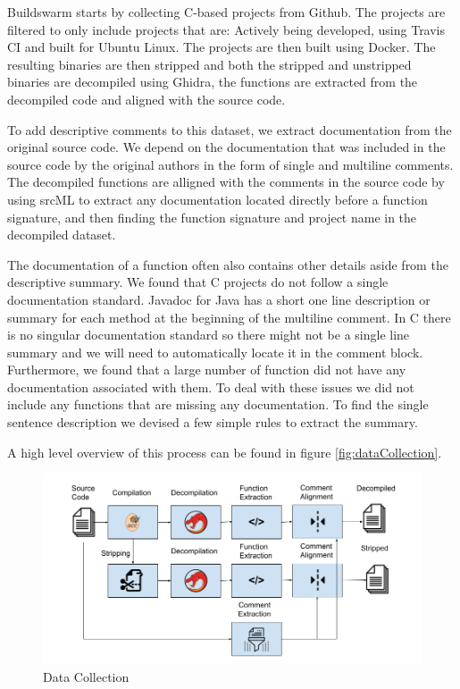 Buildswarm starts by collecting C-based projects from Github. The projects are filtered to only include projects that are: Actively being developed, using Travis CI and built for Ubuntu Linux. The projects are then built using Docker. The resulting binaries are then stripped and both the stripped and unstripped binaries are decompiled using Ghidra, the functions are extracted from the decompiled code and aligned with the source code. 

To add descriptive comments to this dataset, we extract documentation from the original source code. We depend on the documentation that was included in the source code by the original authors in the form of single and multiline comments. The decompiled functions are alligned with the comments in the source code by using srcML to extract any documentation located directly before a function signature, and then finding the function signature and project name in the decompiled dataset.

The documentation of a function often also contains other details aside from the descriptive summary. We found that C projects do not follow a single documentation standard. Javadoc for Java has a short one line description or summary for each method at the beginning of the multiline comment. In C there is no singular documentation standard so there might not be a single line summary and we will need to automatically locate it in the comment block. 
Furthermore, we found that a large number of function did not have any documentation associated with them. To deal with these issues we did not include any functions that are missing any documentation. To find the single sentence description we devised a few simple rules to extract the summary.

A high level overview of this process can be found in figure \ref{fig:dataCollection}.

\label{fig:dataCollection}
\begin{figure}[!h]
  \centering
  \includegraphics[width=\linewidth]{img/dataCollection.png}
  \caption{Data Collection}
\end{figure}

